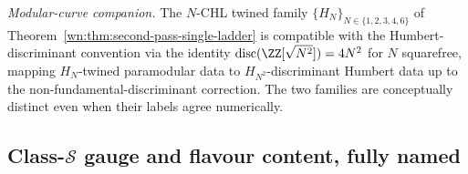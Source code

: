 \begin{theorem}
\emph{Modular-curve companion.} The $N$-CHL twined family
$\{H_N\}_{N \in \{1, 2, 3, 4, 6\}}$ of
Theorem~\ref{wn:thm:second-pass-single-ladder} is compatible with the
Humbert-discriminant convention via the identity
$\mathrm{disc}(\ZZ[\sqrt{N^2}]) = 4N^2$ for $N$ squarefree, mapping
$H_N$-twined paramodular data to $H_{N^2}$-discriminant Humbert data
up to the non-fundamental-discriminant correction. The two families
are conceptually distinct even when their labels agree numerically.
\end{theorem}

\subsection{Class-$\mathcal{S}$ gauge and flavour content, fully named}
\label{wn:subsec:third-pass-class-S}


